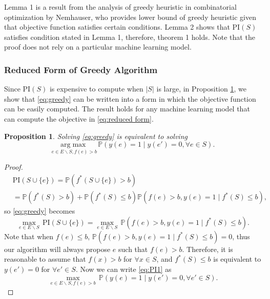 \documentclass[11pt]{article}
\newcommand{\Prob}{\mathbb{P}}
\newcommand{\PI}{\text{PI}}
\newtheorem{proposition}{Proposition}
\begin{document}
Lemma 1 is a result from the analysis of greedy heuristic in combinatorial optimization by 
Nemhauser, who provides lower bound of greedy heuristic given that objective function 
satisfies certain conditions. Lemma 2 shows that $\PI(S)$ satisfies condition stated in 
Lemma 1, therefore, theorem 1 holds. Note that the proof does not rely on a particular machine
learning model.

\subsubsection{Reduced Form of Greedy Algorithm} \label{sec:reduced form}
Since $\PI(S)$ is expensive to compute when $|S|$ is large, in Proposition 
\ref{prop:reduced form}, we show that \eqref{eq:greedy} can be written into a
form in which the objective function can be easily computed. The result
holds for any machine learning model that can compute the objective in
\eqref{eq:reduced form}.
\begin{proposition} \label{prop:reduced form}
  Solving \eqref{eq:greedy} is equivalent to solving
  \begin{equation}
    \underset{e \in E \backslash S, f(e) > b}{\mathrm{arg}\max} \, \Prob (y(e)=1 \mid y(e') = 0, \forall e \in S).
    \label{eq:reduced form}
  \end{equation}
\end{proposition}
\begin{proof}
  \begin{equation*}
    \begin{split}
      &\PI(S \cup \{e\}) = \Prob(f^*(S\cup \{e\}) > b)\\
      &= \Prob(f^*(S) > b) + \Prob(f^*(S)\leq b) \Prob(f(e) > b, y(e) = 1 \mid f^*(S)\leq b),
    \end{split}
  \end{equation*}
  so \eqref{eq:greedy} becomes
  \begin{equation} \label{eq:PI1} 
    \underset{e \in E \backslash S}{\max} \, \PI(S \cup \{e\}) = \underset{e \in E \backslash S}{\max} \, \Prob(f(e) > b, y(e)=1 \mid f^*(S)\leq b).
  \end{equation}
  Note that when $f(e) \leq b$, $\Prob(f(e) > b, y(e) = 1 \mid f^*(S)\leq b) = 0$, thus our algorithm will always propose $e$ such that $f(e) > b$. Therefore, it is reasonable to assume that $f(x) > b$ for $\forall x \in S$, and $f^*(S)\leq b$ is equivalent to $y(e') = 0$ for $\forall e' \in S$. Now we can write \eqref{eq:PI1} as 
  \begin{equation*}
    \underset{e \in E \backslash S, f(e) > b}{\max} \, \Prob (y(e) = 1 \mid y(e') = 0, \forall e' \in S). 
  \end{equation*}
\end{proof}
\end{document}
